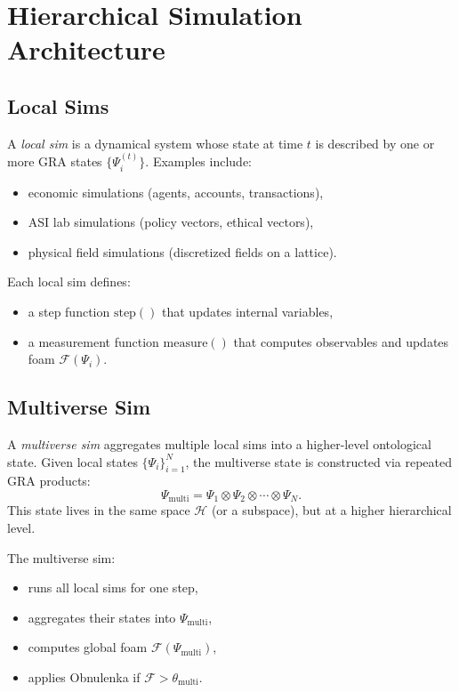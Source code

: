 \documentclass[11pt,a4paper]{article}
\begin{document}
\section{Hierarchical Simulation Architecture}

\subsection{Local Sims}
A \emph{local sim} is a dynamical system whose state at time $t$
is described by one or more GRA states $\{\Psi_i^{(t)}\}$.
Examples include:
\begin{itemize}
  \item economic simulations (agents, accounts, transactions),
  \item ASI lab simulations (policy vectors, ethical vectors),
  \item physical field simulations (discretized fields on a lattice).
\end{itemize}
Each local sim defines:
\begin{itemize}
  \item a step function $\text{step}()$ that updates internal variables,
  \item a measurement function $\text{measure}()$ that computes observables
        and updates foam $\mathcal{F}(\Psi_i)$.
\end{itemize}

\subsection{Multiverse Sim}
A \emph{multiverse sim} aggregates multiple local sims
into a higher-level ontological state.
Given local states $\{\Psi_i\}_{i=1}^N$,
the multiverse state is constructed via repeated GRA products:
\begin{equation}
  \Psi_{\text{multi}}
  = \Psi_1 \otimes \Psi_2 \otimes \cdots \otimes \Psi_N.
  \label{eq:multiverse-state}
\end{equation}
This state lives in the same space $\mathcal{H}$ (or a subspace),
but at a higher hierarchical level.

The multiverse sim:
\begin{itemize}
  \item runs all local sims for one step,
  \item aggregates their states into $\Psi_{\text{multi}}$,
  \item computes global foam $\mathcal{F}(\Psi_{\text{multi}})$,
  \item applies Obnulenka if $\mathcal{F} > \theta_{\text{multi}}$.
\end{itemize}
\end{document}
